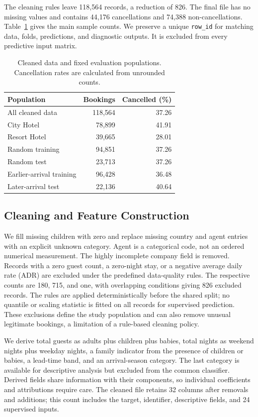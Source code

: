 The cleaning rules leave 118,564 records, a reduction of 826. The final file has no missing values and contains 44,176 cancellations and 74,388 non-cancellations. Table~\ref{tab:data} gives the main sample counts. We preserve a unique \texttt{row\_id} for matching data, folds, predictions, and diagnostic outputs. It is excluded from every predictive input matrix.

\begin{table}[t]
\caption{Cleaned data and fixed evaluation populations. Cancellation rates are calculated from unrounded counts.}
\label{tab:data}
\centering
\begin{tabular}{lrr}
\toprule
Population & Bookings & Cancelled (\%)\\
\midrule
All cleaned data & 118,564 & 37.26\\
City Hotel & 78,899 & 41.91\\
Resort Hotel & 39,665 & 28.01\\
Random training & 94,851 & 37.26\\
Random test & 23,713 & 37.26\\
Earlier-arrival training & 96,428 & 36.48\\
Later-arrival test & 22,136 & 40.64\\
\bottomrule
\end{tabular}
\end{table}

\subsection{Cleaning and Feature Construction}
We fill missing children with zero and replace missing country and agent entries with an explicit unknown category. Agent is a categorical code, not an ordered numerical measurement. The highly incomplete company field is removed. Records with a zero guest count, a zero-night stay, or a negative average daily rate (ADR) are excluded under the predefined data-quality rules. The respective counts are 180, 715, and one, with overlapping conditions giving 826 excluded records. The rules are applied deterministically before the shared split; no quantile or scaling statistic is fitted on all records for supervised prediction. These exclusions define the study population and can also remove unusual legitimate bookings, a limitation of a rule-based cleaning policy.

We derive total guests as adults plus children plus babies, total nights as weekend nights plus weekday nights, a family indicator from the presence of children or babies, a lead-time band, and an arrival-season category. The last category is available for descriptive analysis but excluded from the common classifier. Derived fields share information with their components, so individual coefficients and attributions require care. The cleaned file retains 32 columns after removals and additions; this count includes the target, identifier, descriptive fields, and 24 supervised inputs.

